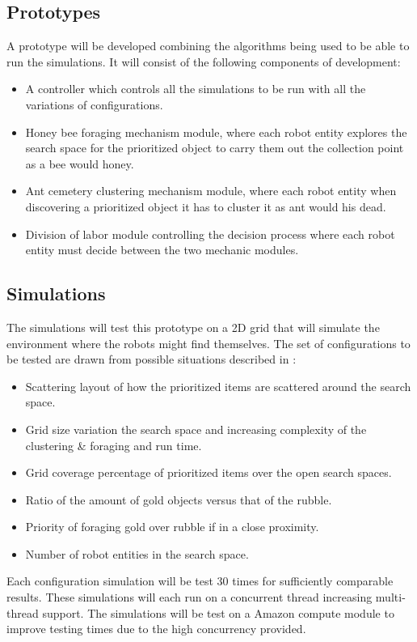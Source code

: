 \documentclass[12pt]{article}
\begin{document}
\subsection{Prototypes}

\par{A prototype will be developed combining the algorithms being used to be able to run the simulations. It will consist of the following components of development:
\begin{itemize}
	\item 	A controller which controls all the simulations to be run with all the 					variations of configurations.
	\item 	Honey bee foraging mechanism module, where each robot entity explores 					the search space for the prioritized object to carry them out the 						collection point as a bee would honey.
	\item 	Ant cemetery clustering mechanism module, where each robot entity when 					discovering a prioritized object it has to cluster it as ant would his 					dead.
	\item 	Division of labor module controlling the decision process where each 					robot entity must decide between the two mechanic modules.
\end{itemize}
}

\subsection{Simulations}

\par{The simulations will test this prototype on a 2D grid that will simulate the environment where the robots might find themselves. The set of configurations to be tested are drawn from possible situations described in \cite{Jade-2014}:}
\begin{itemize}
	\item 	Scattering layout of how the prioritized items are scattered around the search space.
	\item	Grid size variation the search space and increasing complexity of the clustering \& foraging and run time.
	\item	Grid coverage percentage of prioritized items over the open search spaces.
	\item	Ratio of the amount of gold objects versus that of the rubble.
	\item	Priority of foraging gold over rubble if in a close proximity.
	\item	Number of robot entities in the search space.
\end{itemize} 
\par{Each configuration simulation will be test 30 times for sufficiently comparable results. These simulations will each run on a concurrent thread increasing multi-thread support. The simulations will be test on a Amazon compute module to improve testing times due to the high concurrency provided.}
\end{document}
